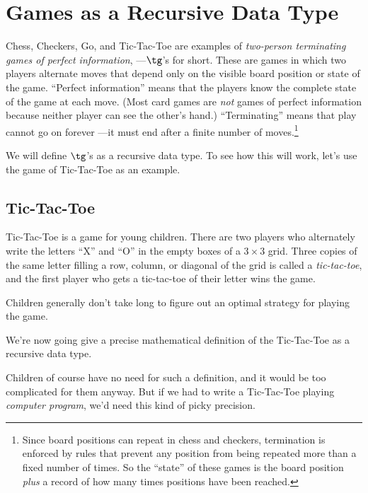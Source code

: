 \begin{definition}
\begin{editingnotes}
\end{editingnotes}


\iffalse

\section{Games as a Recursive Data Type}

Chess, Checkers, Go, and Tic-Tac-Toe are examples of \emph{two-person
  terminating games of perfect information}, ---$\tg$'s for short.  These
are games in which two players alternate moves that depend only on the
visible board position or state of the game.  ``Perfect information''
means that the players know the complete state of the game at each move.
(Most card games are \emph{not} games of perfect information because
neither player can see the other's hand.)  ``Terminating'' means that play
cannot go on forever ---it must end after a finite number of
moves.\footnote{Since board positions can repeat in chess and checkers,
  termination is enforced by rules that prevent any position from being
  repeated more than a fixed number of times.  So the ``state'' of these
  games is the board position \emph{plus} a record of how many times
  positions have been reached.}

We will define $\tg$'s \iffalse in a straightforward way tagged\fi as a 
recursive data type.  To see how this will work, let's use the game of
Tic-Tac-Toe as an example.

\subsection{Tic-Tac-Toe}

Tic-Tac-Toe is a game for young children.  There are two players who
alternately write the letters ``X'' and ``O'' in the empty boxes of a $3
\times 3$ grid.  Three copies of the same letter filling a row, column, or
diagonal of the grid is called a \emph{tic-tac-toe}, and the first player
who gets a tic-tac-toe of their letter wins the game.

\begin{editingnotes}
Children generally don't take long to figure out an optimal strategy
for playing the game.
\end{editingnotes}

We're now going give a precise mathematical definition of the Tic-Tac-Toe
 as a recursive data type.  \iffalse and carefully defining
the allowed moves\fi
\begin{editingnotes}
Children of course have no need for such a definition, and it would be
too complicated for them anyway.  But if we had to write a Tic-Tac-Toe
playing \emph{computer program}, we'd need this kind of picky
precision.
\end{editingnotes}


\end{definition}
